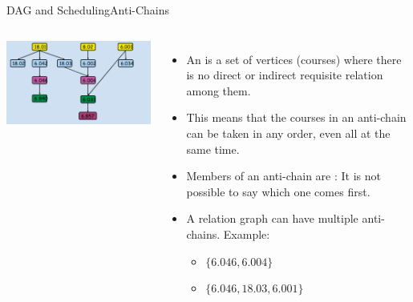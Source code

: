 \begin{frame}{DAG and Scheduling}{Anti-Chains}
  \begin{columns}
    \includegraphics[width=1\textwidth]{../img/greedy_schedule}


    \begin{itemize}
    \item An  is a set of vertices (courses) where there is no direct or indirect requisite relation among them.\medskip

    \item This means that the courses in an anti-chain can be taken in any order, even all at the same time.\medskip

    \item Members of an anti-chain are : It is not possible to say which one comes first.\medskip

    \item A relation graph can have multiple anti-chains. Example:
    \begin{itemize}
      \item $\{6.046, 6.004\}$
      \item $\{6.046, 18.03, 6.001\}$
    \end{itemize}
    \end{itemize}
  \end{columns}
\end{frame}

